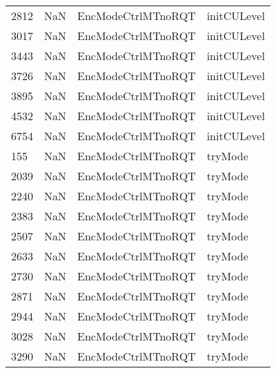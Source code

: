 \begin{tabular}{llll}
2812 &                   NaN &         EncModeCtrlMTnoRQT &                               initCULevel \\
3017 &                   NaN &         EncModeCtrlMTnoRQT &                               initCULevel \\
3443 &                   NaN &         EncModeCtrlMTnoRQT &                               initCULevel \\
3726 &                   NaN &         EncModeCtrlMTnoRQT &                               initCULevel \\
3895 &                   NaN &         EncModeCtrlMTnoRQT &                               initCULevel \\
4532 &                   NaN &         EncModeCtrlMTnoRQT &                               initCULevel \\
6754 &                   NaN &         EncModeCtrlMTnoRQT &                               initCULevel \\
155  &                   NaN &         EncModeCtrlMTnoRQT &                                   tryMode \\
2039 &                   NaN &         EncModeCtrlMTnoRQT &                                   tryMode \\
2240 &                   NaN &         EncModeCtrlMTnoRQT &                                   tryMode \\
2383 &                   NaN &         EncModeCtrlMTnoRQT &                                   tryMode \\
2507 &                   NaN &         EncModeCtrlMTnoRQT &                                   tryMode \\
2633 &                   NaN &         EncModeCtrlMTnoRQT &                                   tryMode \\
2730 &                   NaN &         EncModeCtrlMTnoRQT &                                   tryMode \\
2871 &                   NaN &         EncModeCtrlMTnoRQT &                                   tryMode \\
2944 &                   NaN &         EncModeCtrlMTnoRQT &                                   tryMode \\
3028 &                   NaN &         EncModeCtrlMTnoRQT &                                   tryMode \\
3290 &                   NaN &         EncModeCtrlMTnoRQT &                                   tryMode \\

\end{tabular}
